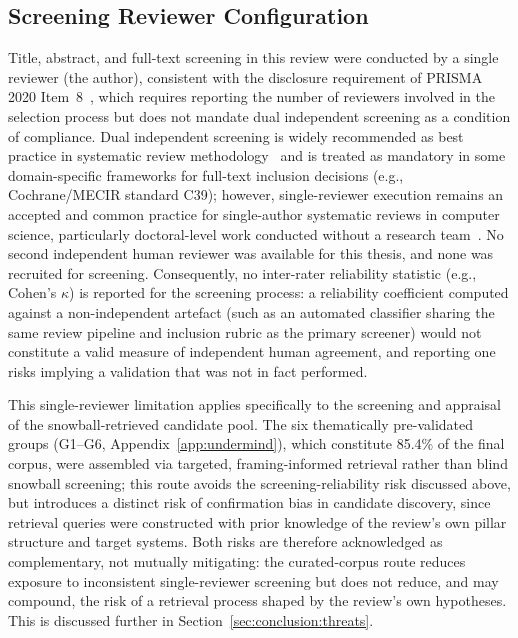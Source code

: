 \subsection*{Screening Reviewer Configuration}
\label{sec:methodology:screening_reviewers}

Title, abstract, and full-text screening in this review were conducted by
a single reviewer (the author), consistent with the disclosure requirement
of PRISMA 2020 Item~8~\cite{Page2021}, which requires reporting the number
of reviewers involved in the selection process but does not mandate dual
independent screening as a condition of compliance. Dual independent
screening is widely recommended as best practice in systematic review
methodology~\cite{KitchenhamCharters2007} and is treated as mandatory in
some domain-specific frameworks for full-text inclusion decisions (e.g.,
Cochrane/MECIR standard C39); however, single-reviewer execution remains
an accepted and common practice for single-author systematic reviews in
computer science, particularly doctoral-level work conducted without a
research team~\cite{KitchenhamCharters2007}. No second independent human
reviewer was available for this thesis, and none was recruited for
screening. Consequently, no inter-rater reliability statistic (e.g.,
Cohen's $\kappa$) is reported for the screening process: a reliability
coefficient computed against a non-independent artefact (such as an
automated classifier sharing the same review pipeline and inclusion
rubric as the primary screener) would not constitute a valid measure of
independent human agreement, and reporting one risks implying a
validation that was not in fact performed.

This single-reviewer limitation applies specifically to the screening and
appraisal of the snowball-retrieved candidate pool. The six thematically
pre-validated groups (G1--G6, Appendix~\ref{app:undermind}), which
constitute 85.4\% of the final corpus, were assembled via targeted,
framing-informed retrieval rather than blind snowball screening; this
route avoids the screening-reliability risk discussed above, but
introduces a distinct risk of confirmation bias in candidate discovery,
since retrieval queries were constructed with prior knowledge of the
review's own pillar structure and target systems. Both risks are
therefore acknowledged as complementary, not mutually mitigating: the
curated-corpus route reduces exposure to inconsistent single-reviewer
screening but does not reduce, and may compound, the risk of a
retrieval process shaped by the review's own hypotheses. This is
discussed further in Section~\ref{sec:conclusion:threats}.

